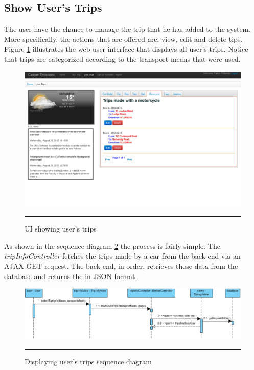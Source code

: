 \subsection{Show User's Trips}

The user have the chance to manage the trip that he has added to the system. More specifically, the actions that are offered are: view, edit and delete tips. Figure \ref{fig:userTrips} illustrates the web user interface that displays all user's trips. Notice that trips are categorized according to the transport means that were used.

\begin{figure}[htbp]
	\centering
		\includegraphics[scale=0.40]{./Figures/chapter4/figure14.pdf}
		\rule{35em}{0.5pt}
	\caption[UI showing user's trips]{UI showing user's trips}
	\label{fig:userTrips}
\end{figure}

As shown in the sequence diagram \ref{fig:userTripsSeqDiagram} the process is fairly simple. The \emph{tripInfoController} fetches the trips made by a car from the back-end via an AJAX GET request. The back-end, in order, retrieves those data from the database and returns the in JSON format.

\begin{landscape}
\begin{figure}[htbp]
	\centering
		\includegraphics[scale=0.55]{./Figures/chapter4/figure15.pdf}
		\rule{35em}{0.5pt}
	\caption[Displaying user's trips sequence diagram]{Displaying user's trips sequence diagram}
	\label{fig:userTripsSeqDiagram}
\end{figure}
\end{landscape}

